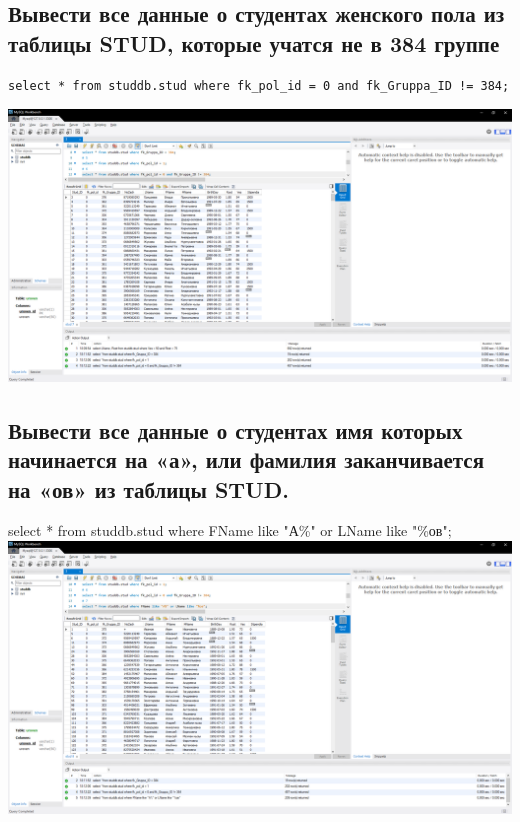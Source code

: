 \documentclass[a4paper, 12pt]{article}
\begin{document}
\subsection{Вывести все данные о студентах женского пола из таблицы STUD, которые учатся не в 384 группе}
\begin{lstlisting}
select * from studdb.stud where fk_pol_id = 0 and fk_Gruppa_ID != 384;  
\end{lstlisting}
\includegraphics[width=\textwidth]{5-6.png}

\subsection{Вывести все данные о студентах имя которых начинается на «а», или фамилия заканчивается на «ов» из таблицы STUD.}
select * from studdb.stud where FName like "А\%" or LName like "\%ов";\\  
\includegraphics[width=\textwidth]{5-7.png}
\end{document}
